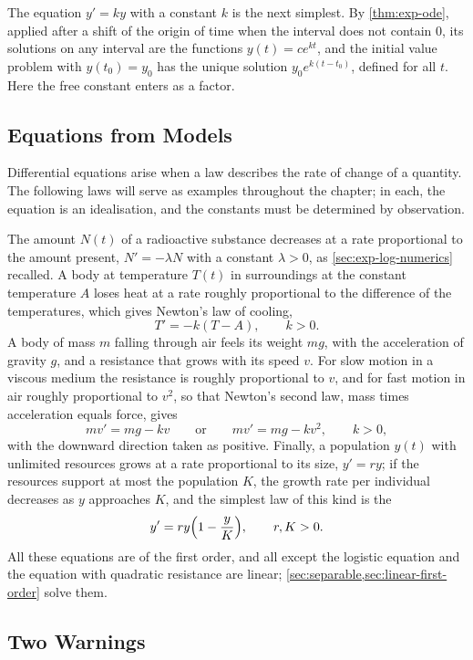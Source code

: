 The equation $y'=ky$ with a constant $k$ is the next simplest. By \cref{thm:exp-ode}, applied after a shift of the origin of time when the interval does not contain $0$, its solutions on any interval are the functions $y(t)=ce^{kt}$, and the initial value problem with $y(t_0)=y_0$ has the unique solution $y_0e^{k(t-t_0)}$, defined for all $t$. Here the free constant enters as a factor.

\subsection{Equations from Models}

Differential equations arise when a law describes the rate of change of a quantity. The following laws will serve as examples throughout the chapter; in each, the equation is an idealisation, and the constants must be determined by observation.

The amount $N(t)$ of a radioactive substance decreases at a rate proportional to the amount present, $N'=-\lambda N$ with a constant $\lambda>0$, as \cref{sec:exp-log-numerics} recalled. A body at temperature $T(t)$ in surroundings at the constant temperature $A$ loses heat at a rate roughly proportional to the difference of the temperatures, which gives Newton's law of cooling,
\[
T'=-k(T-A),\qquad k>0 .
\]
A body of mass $m$ falling through air feels its weight $mg$, with the acceleration of gravity $g$, and a resistance that grows with its speed $v$. For slow motion in a viscous medium the resistance is roughly proportional to $v$, and for fast motion in air roughly proportional to $v^2$, so that Newton's second law, mass times acceleration equals force, gives
\[
mv'=mg-kv\qquad\text{or}\qquad mv'=mg-kv^2,\qquad k>0,
\]
with the downward direction taken as positive. Finally, a population $y(t)$ with unlimited resources grows at a rate proportional to its size, $y'=ry$; if the resources support at most the population $K$, the growth rate per individual decreases as $y$ approaches $K$, and the simplest law of this kind is the 
\begin{equation}
y'=ry\Bigl(1-\frac yK\Bigr),\qquad r,K>0 .
\label{eq:logistic}
\end{equation}
All these equations are of the first order, and all except the logistic equation and the equation with quadratic resistance are linear; \cref{sec:separable,sec:linear-first-order} solve them.

\subsection{Two Warnings}

